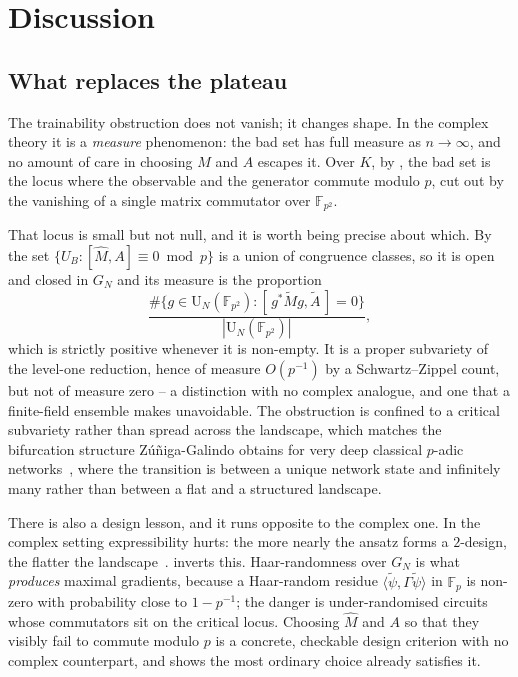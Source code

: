 \documentclass{ceurart}
\theoremstyle{plain}
\theoremstyle{definition}
\theoremstyle{remark}
\theoremstyle{plain}
\newcommand{\inner}[2]{\langle #1, #2\rangle}
\newcommand{\Uni}{\mathrm{U}}
\newcommand{\FF}{\mathbb{F}}
\begin{document}
\section{Discussion}
\label{sec:discussion}

\subsection{What replaces the plateau}

The trainability obstruction does not vanish; it changes shape. In the complex
theory it is a \emph{measure} phenomenon: the bad set has full measure as
$n\to\infty$, and no amount of care in choosing $M$ and $A$ escapes it. Over
$K$, by , the bad set is the locus where the observable and the
generator commute modulo $p$, cut out by the vanishing of a single matrix
commutator over $\FF_{p^2}$.

That locus is small but not null, and it is worth being precise about which.
By  the set $\{U_B:[\widehat M,A]\equiv0\bmod p\}$ is a
union of congruence classes, so it is open and closed in $G_N$ and its measure
is the proportion
\[
  \frac{\#\{g\in\Uni_N(\FF_{p^2}):[\,g^\ast\widetilde Mg,\widetilde A\,]=0\}}
       {|\Uni_N(\FF_{p^2})|},
\]
which is strictly positive whenever it is non-empty. It is a proper subvariety
of the level-one reduction, hence of measure $O(p^{-1})$ by a Schwartz--Zippel
count, but not of measure zero -- a distinction with no complex analogue, and
one that a finite-field ensemble makes unavoidable. The obstruction is
confined to a critical subvariety rather than spread across the landscape,
which matches the bifurcation structure Z\'u\~niga-Galindo obtains for very
deep classical $p$-adic networks~\cite{ZG26crit}, where the transition is
between a unique network state and infinitely many rather than between a flat
and a structured landscape.

There is also a design lesson, and it runs opposite to the complex one. In the
complex setting expressibility hurts: the more nearly the ansatz forms a
$2$-design, the flatter the landscape~\cite{Ho22}.  inverts
this. Haar-randomness over $G_N$ is what \emph{produces} maximal gradients,
because a Haar-random residue $\inner{\tilde\psi}{\Gamma\tilde\psi}$ in $\FF_p$
is non-zero with probability close to $1-p^{-1}$; the danger is
under-randomised circuits whose commutators sit on the critical locus.
Choosing $\widehat M$ and $A$ so that they visibly fail to commute modulo $p$
is a concrete, checkable design criterion with no complex counterpart, and
 shows the most ordinary choice already satisfies it.
\end{document}
